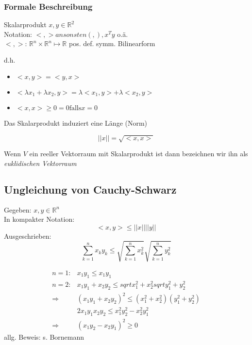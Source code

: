 \subsubsection*{Formale Beschreibung}
\begin{definition} 
Skalarprodukt $ x, y \in \mathbb{R}^2 $ \\
Notation: $ <, > ansonsten (, ), x^T y$ o.ä. \\
$<, >$: $\mathbb{R}^n \times \mathbb{R}^n \mapsto \mathbb{R}$ pos. def. symm. Bilinearform
\end{definition}

d.h. \begin{itemize}
	\item $ <x, y> = <y, x>$
	\item $ <\lambda x_1 + \lambda x_2, y> = \lambda <x_1, y> + \lambda <x_2, y>$
	\item $ <x, x> \geq 0 = 0 \text{falls} x = 0$
\end{itemize}

Das Skalarprodukt induziert eine Länge (Norm)

\begin{equation*}
	|| x || = \sqrt{<x, x>}
\end{equation*}

Wenn $V$ ein reeller Vektorraum mit Skalarprodukt ist dann bezeichnen wir ihn als \emph{euklidischen Vektorraum}

\subsection{Ungleichung von Cauchy-Schwarz}
Gegeben: $x, y \in \mathbb{R}^n$\\
In kompakter Notation:
\begin{equation*}
	<x, y> \leq || x || || y ||
\end{equation*}
Ausgeschrieben:
\begin{equation*}
	\sum_{k=1}^n x_k y_k \leq \sqrt{\sum_{k=1}^n x_k^2} \sqrt{\sum_{k=1}^n y_k^2} 
\end{equation*} 

\begin{align*}
	n = 1:& x_1 y_1 \leq x_1 y_1 \\
	n = 2:& x_1 y_1 + x_2 y_2 \leq sqrt{x_1^2 + x_2^2} sqrt{y_1^2 + y_2^2} \\
	\Rightarrow& (x_1 y_1 + x_2 y_2)^2 \leq (x_1^2 + x_2^2) (y_1^2 + y_2^2) \\
	& 2 x_1 y_1 x_2 y_2 \leq x_1^2 y_2^2 - x_2^2 y_1^2 \\
	\Rightarrow& (x_1 y_2 -  x_2 y_1)^2 \geq 0
\end{align*}
allg. Beweis: s. Bornemann

